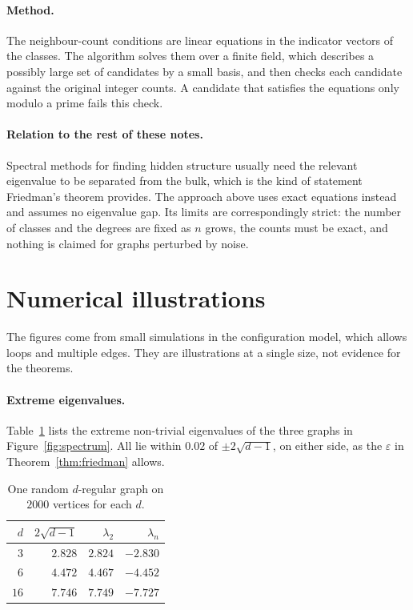 \documentclass[11pt,letterpaper]{article}
\theoremstyle{definition}
\theoremstyle{remark}
\newcommand{\edge}{2\sqrt{d-1}}
\newcommand{\eps}{\varepsilon}
\begin{document}
\paragraph{Method.}
The neighbour-count conditions are linear equations in the indicator vectors of the classes.
The algorithm solves them over a finite field, which describes a possibly large set of candidates
by a small basis, and then checks each candidate against the original integer counts. A candidate
that satisfies the equations only modulo a prime fails this check.

\paragraph{Relation to the rest of these notes.}
Spectral methods for finding hidden structure usually need the relevant eigenvalue to be
separated from the bulk, which is the kind of statement Friedman's theorem provides. The approach
above uses exact equations instead and assumes no eigenvalue gap. Its limits are correspondingly
strict: the number of classes and the degrees are fixed as $n$ grows, the counts must be exact,
and nothing is claimed for graphs perturbed by noise.

\section{Numerical illustrations}

The figures come from small simulations in the configuration model, which allows loops and
multiple edges. They are illustrations at a single size, not evidence for the theorems.

\paragraph{Extreme eigenvalues.}
Table~\ref{tab:extreme} lists the extreme non-trivial eigenvalues of the three graphs in
Figure~\ref{fig:spectrum}. All lie within $0.02$ of $\pm\edge$, on either side, as the $\eps$ in
Theorem~\ref{thm:friedman} allows.

\begin{table}[ht]
\centering\small
\begin{tabular}{@{}rrrr@{}}
  \toprule
  $d$ & $\edge$ & $\lambda_2$ & $\lambda_n$\\
  \midrule
  $3$ & $2.828$ & $2.824$ & $-2.830$\\
  $6$ & $4.472$ & $4.467$ & $-4.452$\\
  $16$ & $7.746$ & $7.749$ & $-7.727$\\
  \bottomrule
\end{tabular}
\caption{One random $d$-regular graph on $2000$ vertices for each $d$.}
\label{tab:extreme}
\end{table}
\end{document}
